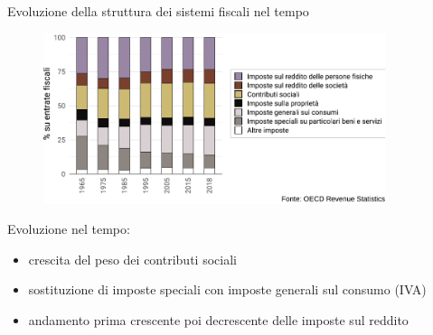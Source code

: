 \documentclass[11pt]{beamer}
\begin{document}
\begin{frame}{Evoluzione della struttura dei sistemi fiscali nel tempo}
\begin{figure}[htbp]
\centering
\includegraphics[height=5cm]{./figure/evoluzione-composizione-entrate-OCSE-color.pdf}
\end{figure}

Evoluzione nel tempo:
\begin{itemize}
\item crescita del peso dei contributi sociali
\item sostituzione di imposte speciali con imposte generali sul consumo (IVA)
\item andamento prima crescente poi decrescente delle imposte sul reddito
\end{itemize}
\end{frame}
\end{document}
